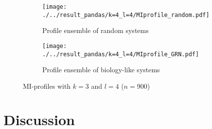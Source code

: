 \documentclass{article}
\providecommand{\DIFaddtex}[1]{{\protect\color{blue}\uwave{#1}}} %
\providecommand{\DIFdeltex}[1]{{\protect\color{red}\sout{#1}}}                      %
\providecommand{\DIFaddbegin}{} %
\providecommand{\DIFaddend}{} %
\providecommand{\DIFdelbegin}{} %
\providecommand{\DIFdelend}{} %
\providecommand{\DIFaddFL}[1]{\DIFadd{#1}} %
\providecommand{\DIFdelFL}[1]{\DIFdel{#1}} %
\providecommand{\DIFaddbeginFL}{} %
\providecommand{\DIFaddendFL}{} %
\providecommand{\DIFdelbeginFL}{} %
\providecommand{\DIFdelendFL}{} %
\providecommand{\DIFadd}[1]{\texorpdfstring{\DIFaddtex{#1}}{#1}} %
\providecommand{\DIFdel}[1]{\texorpdfstring{\DIFdeltex{#1}}{}} %
\begin{document}
\begin{figure}[H]
    \centering
    \begin{subfigure}[b]{0.4\textwidth}
        \DIFdelbeginFL %
\DIFdelendFL \DIFaddbeginFL \texttt{[image: ./../result\_pandas/k=4\_l=4/MIprofile\_random.pdf]}
        \DIFaddendFL \caption{Profile ensemble of random systems}
    \end{subfigure}
    \begin{subfigure}[b]{0.4\textwidth}
        \DIFdelbeginFL %
\DIFdelendFL \DIFaddbeginFL \texttt{[image: ./../result\_pandas/k=4\_l=4/MIprofile\_GRN.pdf]}
        \DIFaddendFL \caption{Profile ensemble of biology-like systems}
    \end{subfigure}
    \caption{MI-profiles with \DIFdelbeginFL \DIFdelFL{$k=3$ }\DIFdelendFL \DIFaddbeginFL \DIFaddFL{$k=4$ }\DIFaddendFL and $l=4$ ($n=900$)}
    \label{fig:profilel4}
\end{figure}


\DIFdelbegin %


\DIFdelend \section{Discussion}
\DIFaddbegin \label{sec:discussion}
\DIFaddend 
\end{document}
